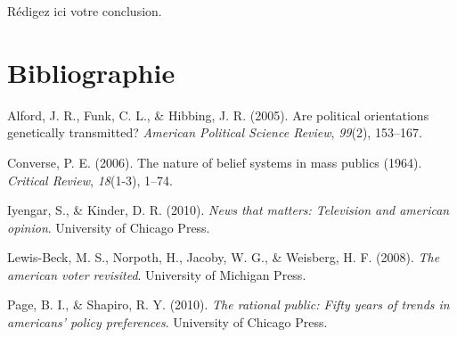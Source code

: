 \documentclass[12pt]{ulaval}
\newlength{\cslhangindent}
\newenvironment{cslreferences}
 {\setlength{\parindent}{0pt}%
  \everypar{\setlength{\hangindent}{\cslhangindent}}\ignorespaces%
  \renewcommand{\bibitem}[2][]{\par}}
 {\par}
\begin{document}
Rédigez ici votre conclusion.

\backmatter

\hypertarget{bibliographie}{%
\chapter*{Bibliographie}\label{bibliographie}}


\hypertarget{refs}{}
\begin{cslreferences}
\leavevmode\hypertarget{ref-alford2005political}{}%
Alford, J. R., Funk, C. L., \& Hibbing, J. R. (2005). Are political orientations genetically transmitted? \emph{American Political Science Review}, \emph{99}(2), 153--167.

\leavevmode\hypertarget{ref-converse2006nature}{}%
Converse, P. E. (2006). The nature of belief systems in mass publics (1964). \emph{Critical Review}, \emph{18}(1-3), 1--74.

\leavevmode\hypertarget{ref-iyengar2010news}{}%
Iyengar, S., \& Kinder, D. R. (2010). \emph{News that matters: Television and american opinion}. University of Chicago Press.

\leavevmode\hypertarget{ref-lewis2008american}{}%
Lewis-Beck, M. S., Norpoth, H., Jacoby, W. G., \& Weisberg, H. F. (2008). \emph{The american voter revisited}. University of Michigan Press.

\leavevmode\hypertarget{ref-page2010rational}{}%
Page, B. I., \& Shapiro, R. Y. (2010). \emph{The rational public: Fifty years of trends in americans' policy preferences}. University of Chicago Press.
\end{cslreferences}


\end{document}
